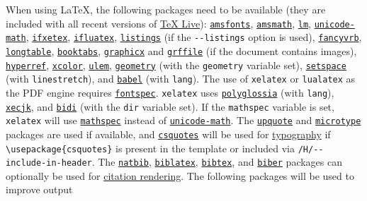 \documentclass[
]{article}
\begin{document}
When using LaTeX, the following packages need to be available (they are
included with all recent versions of
\href{http://www.tug.org/texlive/}{TeX Live}):
\href{https://ctan.org/pkg/amsfonts}{\texttt{amsfonts}},
\href{https://ctan.org/pkg/amsmath}{\texttt{amsmath}},
\href{https://ctan.org/pkg/lm}{\texttt{lm}},
\href{https://ctan.org/pkg/unicode-math}{\texttt{unicode-math}},
\href{https://ctan.org/pkg/ifxetex}{\texttt{ifxetex}},
\href{https://ctan.org/pkg/ifluatex}{\texttt{ifluatex}},
\href{https://ctan.org/pkg/listings}{\texttt{listings}} (if the
\texttt{-\/-listings} option is used),
\href{https://ctan.org/pkg/fancyvrb}{\texttt{fancyvrb}},
\href{https://ctan.org/pkg/longtable}{\texttt{longtable}},
\href{https://ctan.org/pkg/booktabs}{\texttt{booktabs}},
\href{https://ctan.org/pkg/graphicx}{\texttt{graphicx}} and
\href{https://ctan.org/pkg/grffile}{\texttt{grffile}} (if the document
contains images),
\href{https://ctan.org/pkg/hyperref}{\texttt{hyperref}},
\href{https://ctan.org/pkg/xcolor}{\texttt{xcolor}},
\href{https://ctan.org/pkg/ulem}{\texttt{ulem}},
\href{https://ctan.org/pkg/geometry}{\texttt{geometry}} (with the
\texttt{geometry} variable set),
\href{https://ctan.org/pkg/setspace}{\texttt{setspace}} (with
\texttt{linestretch}), and
\href{https://ctan.org/pkg/babel}{\texttt{babel}} (with \texttt{lang}).
The use of \texttt{xelatex} or \texttt{lualatex} as the PDF engine
requires \href{https://ctan.org/pkg/fontspec}{\texttt{fontspec}}.
\texttt{xelatex} uses
\href{https://ctan.org/pkg/polyglossia}{\texttt{polyglossia}} (with
\texttt{lang}), \href{https://ctan.org/pkg/xecjk}{\texttt{xecjk}}, and
\href{https://ctan.org/pkg/bidi}{\texttt{bidi}} (with the \texttt{dir}
variable set). If the \texttt{mathspec} variable is set,
\texttt{xelatex} will use
\href{https://ctan.org/pkg/mathspec}{\texttt{mathspec}} instead of
\href{https://ctan.org/pkg/unicode-math}{\texttt{unicode-math}}. The
\href{https://ctan.org/pkg/upquote}{\texttt{upquote}} and
\href{https://ctan.org/pkg/microtype}{\texttt{microtype}} packages are
used if available, and
\href{https://ctan.org/pkg/csquotes}{\texttt{csquotes}} will be used for
\protect\hyperlink{typography}{typography} if
\texttt{\textbackslash{}usepackage\{csquotes\}} is present in the
template or included via \texttt{/H/-\/-include-in-header}. The
\href{https://ctan.org/pkg/natbib}{\texttt{natbib}},
\href{https://ctan.org/pkg/biblatex}{\texttt{biblatex}},
\href{https://ctan.org/pkg/bibtex}{\texttt{bibtex}}, and
\href{https://ctan.org/pkg/biber}{\texttt{biber}} packages can
optionally be used for \protect\hyperlink{citation-rendering}{citation
rendering}. The following packages will be used to improve output
\end{document}
